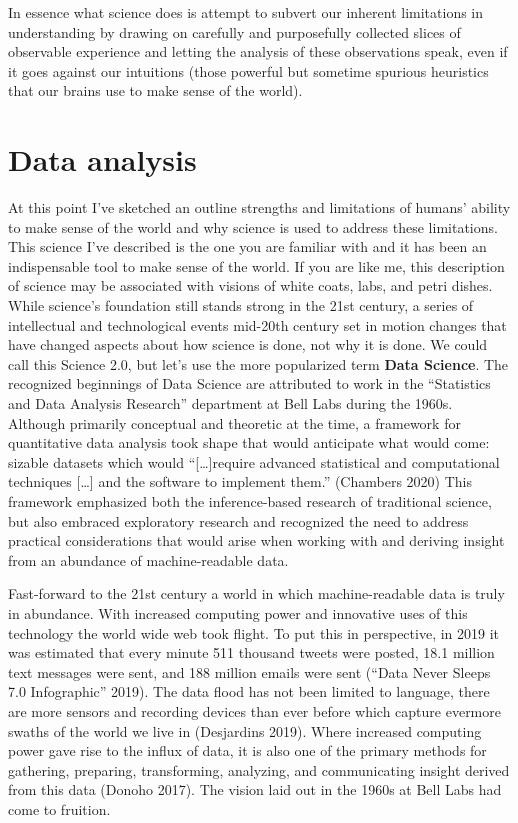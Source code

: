 \documentclass[
  letterpaper,
]{scrbook}
\begin{document}
In essence what science does is attempt to subvert our inherent
limitations in understanding by drawing on carefully and purposefully
collected slices of observable experience and letting the analysis of
these observations speak, even if it goes against our intuitions (those
powerful but sometime spurious heuristics that our brains use to make
sense of the world).

\hypertarget{data-analysis}{%
\section{Data analysis}\label{data-analysis}}

At this point I've sketched an outline strengths and limitations of
humans' ability to make sense of the world and why science is used to
address these limitations. This science I've described is the one you
are familiar with and it has been an indispensable tool to make sense of
the world. If you are like me, this description of science may be
associated with visions of white coats, labs, and petri dishes. While
science's foundation still stands strong in the 21st century, a series
of intellectual and technological events mid-20th century set in motion
changes that have changed aspects about how science is done, not why it
is done. We could call this Science 2.0, but let's use the more
popularized term \textbf{Data Science}. The
recognized beginnings of Data Science are attributed to work in the
``Statistics and Data Analysis Research'' department at Bell Labs during
the 1960s. Although primarily conceptual and theoretic at the time, a
framework for quantitative data analysis took shape that would
anticipate what would come: sizable datasets which would
``{[}\ldots{]}require advanced statistical and computational techniques
{[}\ldots{]} and the software to implement them.'' (Chambers 2020) This
framework emphasized both the inference-based research of traditional
science, but also embraced exploratory research and recognized the need
to address practical considerations that would arise when working with
and deriving insight from an abundance of machine-readable data.

Fast-forward to the 21st century a world in which machine-readable data
is truly in abundance. With increased computing power and innovative
uses of this technology the world wide web took flight. To put this in
perspective, in 2019 it was estimated that every minute 511 thousand
tweets were posted, 18.1 million text messages were sent, and 188
million emails were sent ({``Data Never Sleeps 7.0 Infographic''} 2019).
The data flood has not been limited to language, there are more sensors
and recording devices than ever before which capture evermore swaths of
the world we live in (Desjardins 2019). Where increased computing power
gave rise to the influx of data, it is also one of the primary methods
for gathering, preparing, transforming, analyzing, and communicating
insight derived from this data (Donoho 2017). The vision laid out in the
1960s at Bell Labs had come to fruition.
\end{document}
